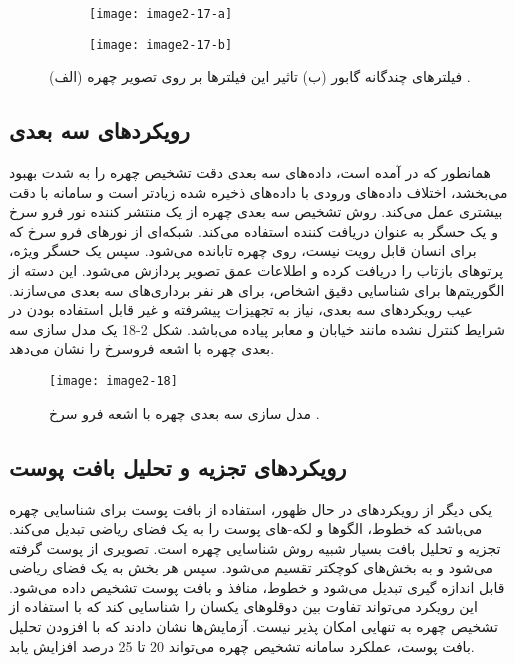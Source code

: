 \begin{figure}
\begin{subfigure}{.5\textwidth}
  \centering
  \texttt{[image: image2-17-a]}
  \label{image2-17-a}
\end{subfigure}
\begin{subfigure}{.5\textwidth}
  \centering
  \texttt{[image: image2-17-b]}
  \label{image2-17-b}
\end{subfigure}
  \caption{(الف) فیلترهای چندگانه گابور (ب) تاثیر این فیلترها بر روی تصویر چهره \cite{ref1}.}
\label{fig:image2-17}
\end{figure}

\subsection{رویکرد‌های سه بعدی}
همانطور که در \cite{10.3745/JIPS.2009.5.2.041} آمده است، داده‌های سه بعدی دقت تشخیص چهره را به شدت بهبود می‌بخشد، اختلاف داده‌های ورودی با داده‌های ذخیره شده زیادتر است و سامانه با دقت بیشتری عمل می‌کند. روش تشخیص سه بعدی چهره از یک منتشر کننده نور فرو سرخ و یک حسگر به عنوان دریافت کننده استفاده می‌کند. شبکه‌ای از نورهای فرو سرخ که برای انسان قابل رویت نیست، روی چهره تابانده می‌شود. سپس یک حسگر ویژه، پرتوهای بازتاب را دریافت کرده و اطلاعات عمق تصویر پردازش می‌شود. این دسته از الگوریتم‌ها برای شناسایی دقیق اشخاص، برای هر نفر برداری‌های سه بعدی می‌سازند. عیب رویکردهای سه بعدی، نیاز به تجهیزات پیشرفته و غیر قابل استفاده بودن در شرایط کنترل نشده مانند خیابان و معابر پیاده می‌باشد. شکل 2-18 یک مدل سازی سه بعدی چهره با اشعه فروسرخ را نشان می‌دهد.

\begin{figure}[h]
\centering
  \texttt{[image: image2-18]}
  \caption{مدل سازی سه بعدی چهره با اشعه فرو سرخ \cite{ref1}.}
  \label{image2-15}
\end{figure}
 
 \subsection{رویکرد‌های تجزیه و تحلیل بافت پوست}
یکی دیگر از رویکردهای در حال ظهور، استفاده از بافت پوست برای شناسایی چهره می‌باشد که خطوط، الگوها و لکه-های پوست را به یک فضای ریاضی تبدیل می‌کند. تجزیه و تحلیل بافت بسیار شبیه روش شناسایی چهره است. تصویری از پوست گرفته می‌شود و به بخش‌های کوچکتر تقسیم می‌شود. سپس هر بخش به یک فضای ریاضی قابل اندازه گیری تبدیل می‌شود و خطوط، منافذ و بافت پوست تشخیص داده می‌شود. این رویکرد می‌تواند تفاوت بین دوقلوهای یکسان را شناسایی کند که با استفاده از تشخیص چهره به تنهایی امکان پذیر نیست. آزمایش‌ها نشان دادند که با افزودن تحلیل بافت پوست، عملکرد سامانه تشخیص چهره می‌تواند 20 تا 25 درصد افزایش یابد.

